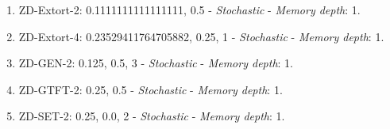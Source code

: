 \documentclass[10pt,letterpaper]{article}
\begin{document}
\begin{enumerate}
\item ZD-Extort-2: 0.1111111111111111, 0.5 - \textit{Stochastic} - \textit{Memory depth}: 1. \cite{Stewart2012}
\item ZD-Extort-4: 0.23529411764705882, 0.25, 1 - \textit{Stochastic} - \textit{Memory depth}: 1. \cite{axelrodproject}
\item ZD-GEN-2: 0.125, 0.5, 3 - \textit{Stochastic} - \textit{Memory depth}: 1. \cite{Kuhn2017}
\item ZD-GTFT-2: 0.25, 0.5 - \textit{Stochastic} - \textit{Memory depth}: 1. \cite{Stewart2012}
\item ZD-SET-2: 0.25, 0.0, 2 - \textit{Stochastic} - \textit{Memory depth}: 1. \cite{Kuhn2017}
\end{enumerate}
\end{document}
